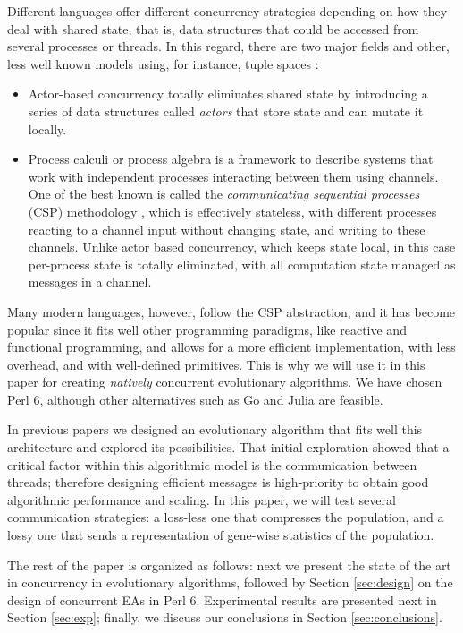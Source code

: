 \documentclass[runningheads]{llncs}\usepackage[]{graphicx}\usepackage[]{color}
\begin{document}
Different languages offer different concurrency strategies depending
on how they deal with shared state, 
that is, data structures that could be accessed from several processes or
threads. In this regard, there are two major fields and other, less well known models using, for instance, tuple
  spaces \cite{gelernter1985generative}:
\begin{itemize}
\item Actor-based concurrency \cite{schippers2009towards}
totally eliminates shared state by introducing a series of data
structures called {\em actors} that
store state and can mutate it locally. 
\item Process calculi or process algebra is a framework to describe
  systems that work with independent
  processes interacting between them using channels. One of the best
  known is called the {\em communicating sequential processes} (CSP)
methodology \cite{Hoare:1978:CSP:359576.359585}, which is effectively
stateless, with different processes reacting to a channel input without
changing state, and writing to these channels. Unlike actor based
concurrency, which keeps state local, in this case per-process state is totally
eliminated, with all computation state managed as messages in a channel.
\end{itemize}

Many modern languages, however, follow the CSP abstraction, and it has
become popular since it fits well other programming paradigms, like
reactive and functional programming, and allows for a more efficient
implementation, with less overhead, and with well-defined
primitives. This is why we will use it in this paper for creating  {\em natively}
concurrent evolutionary algorithms. We have chosen Perl 6, although 
other alternatives such as Go and Julia are feasible.

In previous papers
\cite{Merelo:2018:MEA:3205651.3208317,merelo:WEA} we
designed an evolutionary algorithm that fits well this architecture
and explored its possibilities. That initial exploration showed that
a critical factor within this algorithmic model is the communication
between threads; therefore designing
efficient messages is high-priority to obtain good algorithmic
performance and scaling. In this paper, we will test several
communication strategies: a loss-less one that compresses the population,
and a lossy one that sends a representation of gene-wise
statistics of the population.

The rest of the paper is organized as follows: next we present the
state of the art in concurrency in evolutionary algorithms, followed
by Section \ref{sec:design} on the design of concurrent EAs in Perl 6. 
Experimental results are presented next in Section
\ref{sec:exp}; finally, we discuss our conclusions in Section
\ref{sec:conclusions}. 
\end{document}
